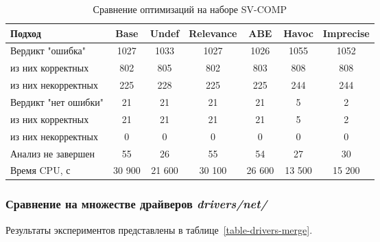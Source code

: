 \begin{center}
  \begin{table}[h]\footnotesize \centering
  	\label{table-sv-comp-opt}
    \caption{Сравнение оптимизаций на наборе SV-COMP}
    \begin{tabular}{ | l | c | c | c | c | c | c | }
      \hline
      Подход         				& Base 	& Undef 	& Relevance & ABE 	& Havoc 	&  Imprecise \\ \hline
      Вердикт "ошибка" 				& 1027  & 1033  	& 1027      & 1026  & 1055     	& 1052       \\ 
  \hspace{0.5cm} из них корректных 	& 802 	& 805 		& 802     	& 803   & 808    	& 808     	\\ 
  \hspace{0.5cm} из них некорректных & 225 	& 228 		& 225     	& 225  	& 244      	& 244       \\ \hline
      Вердикт "нет ошибки"  		& 21    & 21    	& 21    	& 21   	& 5     	& 2       \\ 
  \hspace{0.5cm} из них корректных 	& 21 	& 21    	& 21     	& 21   	& 5     	& 2       \\
  \hspace{0.5cm} из них некорректных & 0 	& 0    		& 0     	& 0   	& 0     	& 0       \\ \hline
      Анализ не завершен       		& 55     & 26     	& 55     	& 54   	& 27     	& 30      	\\ \hline
      Время CPU, с   				& 30 900 & 21 600 	& 30 100  	& 26 600 & 13 500   & 15 200     	\\ 
      \hline
    \end{tabular}
  \end{table}
\end{center}

\subsubsection{Сравнение на множестве драйверов \textit{drivers/net/} }

Результаты экспериментов представлены в таблице~\ref{table-drivers-merge}.

